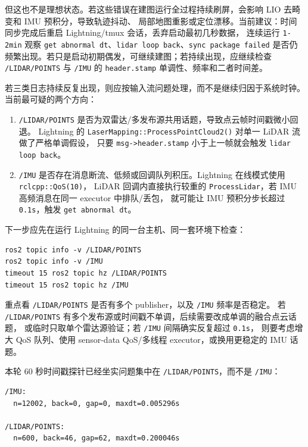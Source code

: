 \documentclass[UTF8,11pt,a4paper]{ctexart}
\begin{document}
但这也不是理想状态。若这些错误在建图运行全过程持续刷屏，会影响 LIO 去畸变和 IMU 预积分，导致轨迹抖动、
局部地图重影或定位漂移。当前建议：时间同步完成后重启 Lightning/tmux 会话，丢弃启动最初几秒数据，
连续运行 \texttt{1-2min} 观察 \texttt{get abnormal dt}、\texttt{lidar loop back}、\texttt{sync package failed}
是否仍频繁出现。若只是启动初期偶发，可继续建图；若持续出现，应继续检查 \texttt{/LIDAR/POINTS} 与
\texttt{/IMU} 的 \texttt{header.stamp} 单调性、频率和二者时间差。

若三类日志持续反复出现，则应按输入流问题处理，而不是继续归因于系统时钟。当前最可疑的两个方向：

\begin{enumerate}
  \item \texttt{/LIDAR/POINTS} 是否为双雷达/多发布源共用话题，导致点云帧时间戳微小回退。
  Lightning 的 \texttt{LaserMapping::ProcessPointCloud2()} 对单一 LiDAR 流做了严格单调假设，
  只要 \texttt{msg->header.stamp} 小于上一帧就会触发 \texttt{lidar loop back}。
  \item \texttt{/IMU} 是否存在消息断流、低频或回调队列积压。Lightning 在线模式使用 \texttt{rclcpp::QoS(10)}，
  LiDAR 回调内直接执行较重的 \texttt{ProcessLidar}，若 IMU 高频消息在同一 executor 中排队/丢包，
  就可能让 IMU 预积分步长超过 \texttt{0.1s}，触发 \texttt{get abnormal dt}。
\end{enumerate}

下一步应先在运行 Lightning 的同一台主机、同一套环境下检查：

\begin{verbatim}
ros2 topic info -v /LIDAR/POINTS
ros2 topic info -v /IMU
timeout 15 ros2 topic hz /LIDAR/POINTS
timeout 15 ros2 topic hz /IMU
\end{verbatim}

重点看 \texttt{/LIDAR/POINTS} 是否有多个 publisher，以及 \texttt{/IMU} 频率是否稳定。
若 \texttt{/LIDAR/POINTS} 有多个发布源或时间戳不单调，后续需要改成单调的融合点云话题，
或临时只取单个雷达源验证；若 \texttt{/IMU} 间隔确实反复超过 \texttt{0.1s}，
则要考虑增大 QoS 队列、使用 sensor-data QoS/多线程 executor，或换用更稳定的 IMU 话题。

本轮 60 秒时间戳探针已经坐实问题集中在 \texttt{/LIDAR/POINTS}，而不是 \texttt{/IMU}：

\begin{verbatim}
/IMU:
  n=12002, back=0, gap=0, maxdt=0.005296s

/LIDAR/POINTS:
  n=600, back=46, gap=62, maxdt=0.200046s
\end{verbatim}
\end{document}
